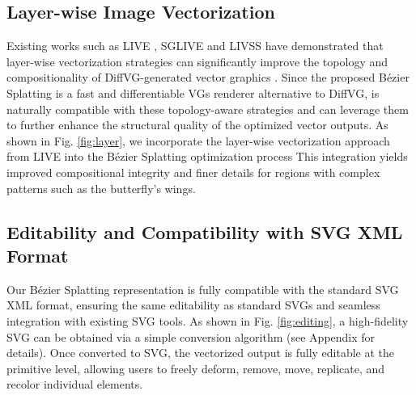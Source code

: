 \vspace{-.5em}
\subsection{Layer-wise Image Vectorization}
Existing works such as LIVE \cite{xu2022live}, SGLIVE \cite{zhou2024segmentation} and LIVSS \cite{livss} have demonstrated that layer-wise vectorization strategies can significantly improve the topology and compositionality of DiffVG-generated vector graphics \cite{Li:2020:DVG}.
Since the proposed Bézier Splatting is a fast and differentiable VGs renderer alternative to DiffVG, is naturally compatible with these topology-aware strategies and can leverage them to further enhance the structural quality of the optimized vector outputs.
As shown in Fig. \ref{fig:layer}, we incorporate the layer-wise vectorization approach from LIVE \cite{xu2022live} into the Bézier Splatting optimization process
This integration yields improved compositional integrity and finer details for regions with complex patterns such as the butterfly's wings.

\vspace{-.5em}
\subsection{Editability and Compatibility with SVG XML Format}
Our Bézier Splatting representation is fully compatible with the standard SVG XML format, ensuring the same editability as standard SVGs and seamless integration with existing SVG tools.
As shown in Fig. \ref{fig:editing}, a high-fidelity SVG can be obtained via a simple conversion algorithm (see Appendix for details).
Once converted to SVG, the vectorized output is fully editable at the primitive level, allowing users to freely deform, remove, move, replicate, and recolor individual elements.










